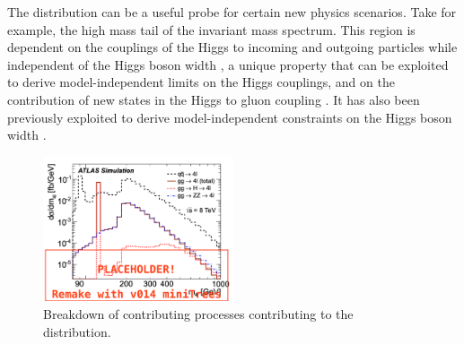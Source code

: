 The \mFourL distribution can be a useful probe for certain new physics scenarios. Take for example, the high mass tail of the invariant mass spectrum. This region is dependent on the couplings of the Higgs to incoming and outgoing particles while independent of the Higgs boson width \cite{Campbell_2016}, a unique property that can be exploited to derive model-independent limits on the Higgs couplings, and on the  contribution of new states in the Higgs to gluon coupling \cite{Cacciapaglia_2014}. It has also been previously exploited to derive model-independent constraints on the Higgs boson width \cite{Caola_2013}. 


\begin{figure}
    \centering
    \includegraphics[width=0.5\textwidth]{Figures/m4l/m4lbreakdown.png}
    \caption{Breakdown of contributing processes contributing to the \mFourL distribution.}
    \label{fig:m4lbreakdown}
\end{figure}

